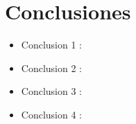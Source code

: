 \documentclass[preprint,12pt]{elsarticle}
\begin{document}

\section{Conclusiones}

\begin{itemize}

\item Conclusion 1 : \\

\item Conclusion 2 : \\ 

\item Conclusion 3 : \\ 

\item Conclusion 4 : \\ 
\end{itemize}


	
	\newpage
	
		 
	
	
\end{document}
